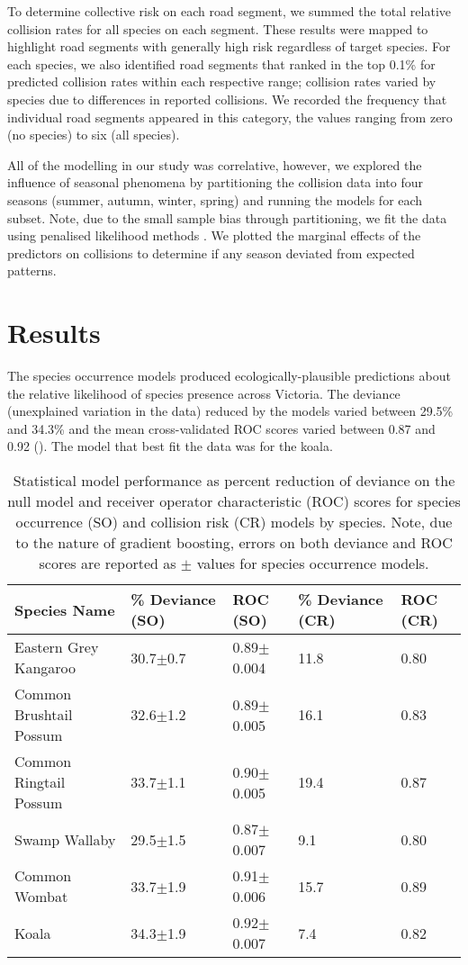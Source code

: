 To determine collective risk on each road segment, we summed the total relative collision rates for all species on each segment.  These results were mapped to highlight road segments with generally high risk regardless of target species. For each species, we also identified road segments that ranked in the top 0.1\% for predicted collision rates within each respective range; collision rates varied by species due to differences in reported collisions. We recorded the frequency that individual road segments appeared in this category, the values ranging from zero (no species) to six (all species).

All of the modelling in our study was correlative, however, we explored the influence of seasonal phenomena by partitioning the collision data into four seasons (summer, autumn, winter, spring) and running the models for each subset. Note, due to the small sample bias through partitioning, we fit the data using penalised likelihood methods \citep{firt93}.  We plotted the marginal effects of the predictors on collisions to determine if any season deviated from expected patterns.

\section{Results}

The species occurrence models produced ecologically-plausible predictions about the relative likelihood of species presence across Victoria. The deviance (unexplained variation in the data) reduced by the models varied between 29.5\% and 34.3\% and the mean cross-validated ROC scores varied between 0.87 and 0.92 (). The model that best fit the data was for the koala. 

\begin{table}[htp]
\caption[Statistical model performance for six mammal species]{Statistical model performance as percent reduction of deviance on the null model and receiver operator characteristic (ROC) scores for species occurrence (SO) and collision risk (CR) models by species. Note, due to the nature of gradient boosting, errors on both deviance and ROC scores are reported as $\pm$ values for species occurrence models.}
\centering
\begin{tabularx}{0.9\textwidth}{lllll} \toprule
Species Name			&\% Deviance (SO)	&ROC (SO)			&\% Deviance (CR)	&ROC (CR)\\
\midrule 
Eastern Grey Kangaroo	& 30.7$\pm$0.7 		& 0.89$\pm$0.004	& 11.8 				& 0.80 \\ 
Common Brushtail Possum & 32.6$\pm$1.2 		& 0.89$\pm$0.005 	& 16.1 				& 0.83 \\ 
Common Ringtail Possum 	& 33.7$\pm$1.1 		& 0.90$\pm$0.005 	& 19.4 				& 0.87 \\ 
Swamp Wallaby		 	& 29.5$\pm$1.5 		& 0.87$\pm$0.007 	& 9.1 				& 0.80 \\ 
Common Wombat 			& 33.7$\pm$1.9 		& 0.91$\pm$0.006 	& 15.7 				& 0.89 \\ 
Koala 					& 34.3$\pm$1.9 		& 0.92$\pm$0.007 	& 7.4 				& 0.82 \\ 
\bottomrule
\end{tabularx}
\label{6sp_models}
\end{table}

